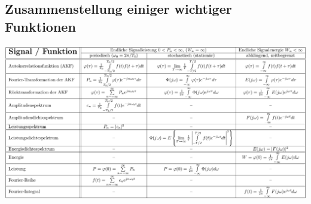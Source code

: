 
	\subsection{Zusammenstellung einiger wichtiger Funktionen }
		\includegraphics[width=24.5cm,angle=90]{./bilder/zusammenstellung.png}
	